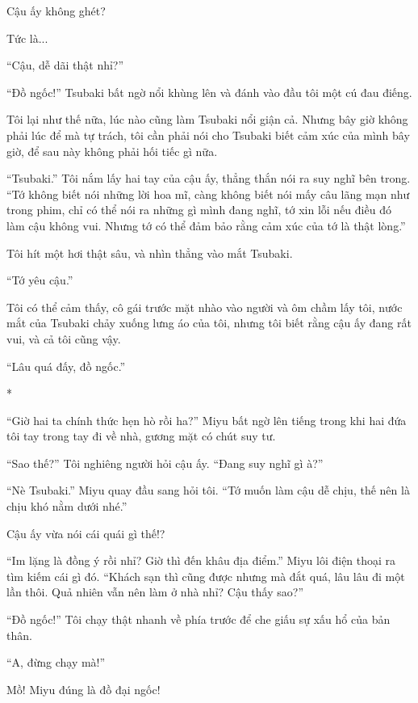 {Cậu ấy không ghét?

Tức là...

``Cậu, dễ dãi thật nhỉ?''

``Đồ ngốc!'' Tsubaki bất ngờ nổi khùng lên và đánh vào đầu tôi một cú
đau điếng.

Tôi lại như thế nữa, lúc nào cũng làm Tsubaki nổi giận cả. Nhưng bây giờ
không phải lúc để mà tự trách, tôi cần phải nói cho Tsubaki biết cảm xúc
của mình bây giờ, để sau này không phải hối tiếc gì nữa.

``Tsubaki.'' Tôi nắm lấy hai tay của cậu ấy, thẳng thắn nói ra suy nghĩ
bên trong. ``Tớ không biết nói những lời hoa mĩ, càng không biết nói mấy
câu lãng mạn như trong phim, chỉ có thể nói ra những gì mình đang nghĩ,
tớ xin lỗi nếu điều đó làm cậu không vui. Nhưng tớ có thể đảm bảo rằng
cảm xúc của tớ là thật lòng.''

Tôi hít một hơi thật sâu, và nhìn thẳng vào mắt Tsubaki.

``Tớ yêu cậu.''

Tôi có thể cảm thấy, cô gái trước mặt nhào vào người và ôm chầm lấy tôi,
nước mắt của Tsubaki chảy xuống lưng áo của tôi, nhưng tôi biết rằng cậu
ấy đang rất vui, và cả tôi cũng vậy.

``Lâu quá đấy, đồ ngốc.''

*

``Giờ hai ta chính thức hẹn hò rồi ha?'' Miyu bất ngờ lên tiếng trong
khi hai đứa tôi tay trong tay đi về nhà, gương mặt có chút suy tư.

``Sao thế?'' Tôi nghiêng người hỏi cậu ấy. ``Đang suy nghĩ gì à?''

``Nè Tsubaki.'' Miyu quay đầu sang hỏi tôi. ``Tớ muốn làm cậu dễ chịu,
thế nên là chịu khó nằm dưới nhé.''

Cậu ấy vừa nói cái quái gì thế!?

``Im lặng là đồng ý rồi nhỉ? Giờ thì đến khâu địa điểm.'' Miyu lôi điện
thoại ra tìm kiếm cái gì đó. ``Khách sạn thì cũng được nhưng mà đắt quá,
lâu lâu đi một lần thôi. Quả nhiên vẫn nên làm ở nhà nhỉ? Cậu thấy
sao?''

``Đồ ngốc!'' Tôi chạy thật nhanh về phía trước để che giấu sự xấu hổ của
bản thân.

``A, đừng chạy mà!''

Mồ! Miyu đúng là đồ đại ngốc!

}